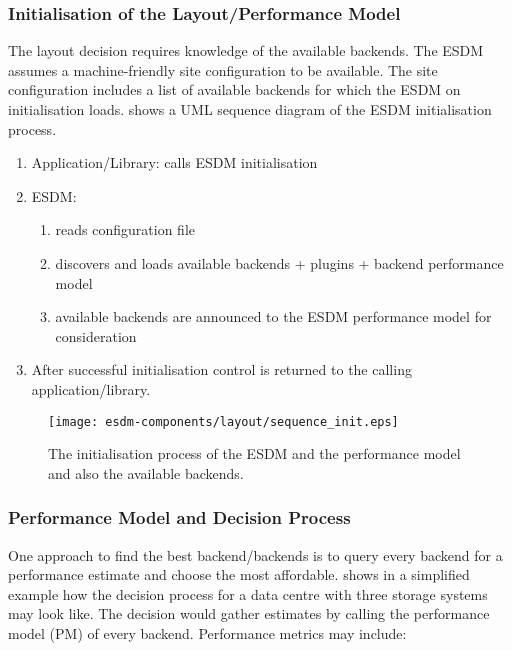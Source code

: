 \subsubsection{Initialisation of the Layout/Performance Model}
\label{sec:layout/logical/init}

The layout decision requires knowledge of the available backends.
The ESDM assumes a machine-friendly site configuration to be available.
The site configuration includes a list of available backends for which the ESDM on initialisation loads.
 shows a UML sequence diagram of the ESDM initialisation process.

\begin{enumerate}
	\item Application/Library: calls ESDM initialisation
	\item ESDM:
	\begin{enumerate}
		\item reads configuration file
		\item discovers and loads available backends + plugins + backend performance model
		\item available backends are announced to the ESDM performance model for consideration
	\end{enumerate}
	\item After successful initialisation control is returned to the calling application/library.
\end{enumerate}

\begin{figure}
	\centering
	\texttt{[image: esdm-components/layout/sequence\_init.eps]}
	\caption{The initialisation process of the ESDM and the performance model and also the available backends.}
	\label{fig:esdm layout initialisation}
\end{figure}



\subsubsection{Performance Model and Decision Process}
\label{sec: layout/logical/decision}

One approach to find the best backend/backends is to query every backend for a performance estimate and choose the most affordable.
 shows in a simplified example how the decision process for a data centre with three storage systems may look like.
The decision would gather estimates by calling the performance model (PM) of every backend.
Performance metrics may include:

